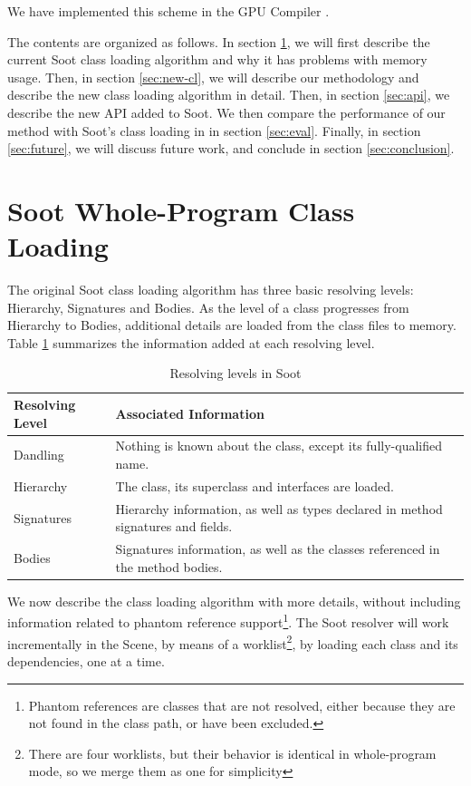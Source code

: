 \documentclass{sigplanconf}
\begin{document}
We have implemented this scheme in the \rb GPU Compiler \cite{rootbeer}. 

The contents are organized as follows. In section \ref{sec:soot-cl}, we will first describe the current Soot class loading algorithm and why it has problems with memory usage. Then, in section \ref{sec:new-cl}, we will describe our methodology and describe the new class loading algorithm in detail. Then, in section \ref{sec:api}, we describe the new API added to Soot. We then compare the performance of our method with Soot's class loading in \rb in section \ref{sec:eval}. Finally, in section \ref{sec:future}, we will discuss future work, and conclude in section \ref{sec:conclusion}.

\section{Soot Whole-Program Class Loading}
\label{sec:soot-cl}

The original Soot class loading algorithm has three basic resolving levels: Hierarchy, Signatures and Bodies. As the level of a class progresses from Hierarchy to Bodies, additional details are loaded from the class files to memory. Table \ref{tbl:resolving_levels} summarizes the information added at each resolving level. 

\begin{table}
\begin{tabularx}{\columnwidth}{|l|X|}
\hline
\textbf{Resolving Level} & \textbf{Associated Information} \\\hline
Dandling  & Nothing is known about the class, except its fully-qualified name.\\\hline
Hierarchy & The class, its superclass and interfaces are loaded. \\\hline
Signatures & Hierarchy information, as well as types declared in method signatures and fields. \\\hline
Bodies & Signatures information, as well as the classes referenced in the method bodies. \\\hline
\end{tabularx}
\caption{Resolving levels in Soot}
\label{tbl:resolving_levels}
\end{table}

We now describe the class loading algorithm with more details, without including information related to phantom reference support\footnote{Phantom references are classes that are not resolved, either because they are not found in the class path, or have been excluded.}.
The Soot resolver will work incrementally in the Scene, by means of a worklist\footnote{There are four worklists, but their behavior is identical in whole-program mode, so we merge them as one for simplicity}, by loading each class and its dependencies, one at a time.
\end{document}
